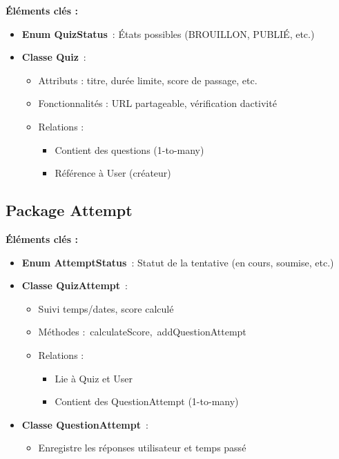 \documentclass[12pt,a4paper,twoside,openright]{report}
\begin{document}
\textbf{Éléments clés :}

\begin{itemize}
\item
  \textbf{Enum QuizStatus}~: États possibles (BROUILLON, PUBLIÉ, etc.)
\item
  \textbf{Classe Quiz}~:

  \begin{itemize}
  \item
    Attributs : titre, durée limite, score de passage, etc.
  \item
    Fonctionnalités : URL partageable, vérification
    d\textquotesingle activité
  \item
    Relations :

    \begin{itemize}
    \item
      Contient des questions (1-to-many)
    \item
      Référence à User (créateur)
    \end{itemize}
  \end{itemize}
\end{itemize}

\hypertarget{package-attempt}{%
\subsection{Package Attempt}\label{package-attempt}}

\textbf{Éléments clés :}

\begin{itemize}
\item
  \textbf{Enum AttemptStatus}~: Statut de la tentative (en cours,
  soumise, etc.)
\item
  \textbf{Classe QuizAttempt}~:

  \begin{itemize}
  \item
    Suivi temps/dates, score calculé
  \item
    Méthodes :~calculateScore,~addQuestionAttempt
  \item
    Relations :

    \begin{itemize}
    \item
      Lie à Quiz et User
    \item
      Contient des QuestionAttempt (1-to-many)
    \end{itemize}
  \end{itemize}
\item
  \textbf{Classe QuestionAttempt}~:

  \begin{itemize}
  \item
    Enregistre les réponses utilisateur et temps passé
  \end{itemize}
\end{itemize}
\end{document}
